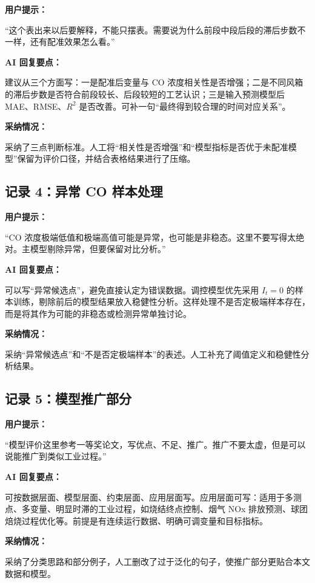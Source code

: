 \documentclass[UTF8,a4paper,zihao=-4]{ctexart}
\begin{document}
\noindent\textbf{用户提示：}

“这个表出来以后要解释，不能只摆表。需要说为什么前段中段后段的滞后步数不一样，还有配准效果怎么看。”

\noindent\textbf{AI 回复要点：}

建议从三个方面写：一是配准后变量与 CO 浓度相关性是否增强；二是不同风箱的滞后步数是否符合前段较长、后段较短的工艺认识；三是输入预测模型后 MAE、RMSE、$R^2$ 是否改善。可补一句“最终得到较合理的时间对应关系”。

\noindent\textbf{采纳情况：}

采纳了三点判断标准。人工将“相关性是否增强”和“模型指标是否优于未配准模型”保留为评价口径，并结合表格结果进行了压缩。

\subsection*{记录 4：异常 CO 样本处理}

\noindent\textbf{用户提示：}

“CO 浓度极端低值和极端高值可能是异常，也可能是非稳态。这里不要写得太绝对。主模型剔除异常，但要保留对比分析。”

\noindent\textbf{AI 回复要点：}

可以写“异常候选点”，避免直接认定为错误数据。调控模型优先采用 $I_t=0$ 的样本训练，剔除前后的模型结果放入稳健性分析。这样处理不是否定极端样本存在，而是将其作为可能的非稳态或检测异常单独讨论。

\noindent\textbf{采纳情况：}

采纳“异常候选点”和“不是否定极端样本”的表述。人工补充了阈值定义和稳健性分析结果。

\subsection*{记录 5：模型推广部分}

\noindent\textbf{用户提示：}

“模型评价这里参考一等奖论文，写优点、不足、推广。推广不要太虚，但是可以说能推广到类似工业过程。”

\noindent\textbf{AI 回复要点：}

可按数据层面、模型层面、约束层面、应用层面写。应用层面可写：适用于多测点、多变量、明显时滞的工业过程，如烧结终点控制、烟气 NOx 排放预测、球团焙烧过程优化等。前提是有连续运行数据、明确可调变量和目标指标。

\noindent\textbf{采纳情况：}

采纳了分类思路和部分例子，人工删改了过于泛化的句子，使推广部分更贴合本文数据和模型。
\end{document}
